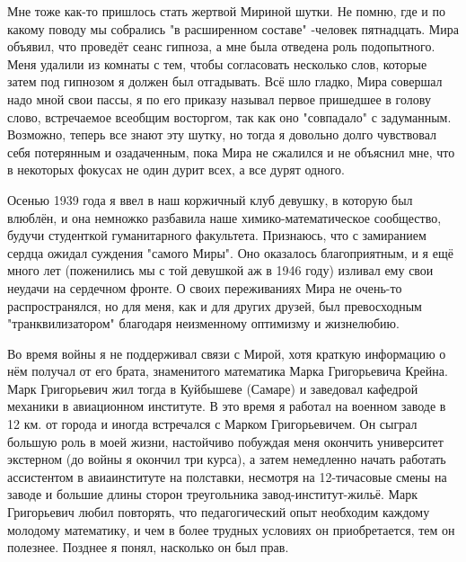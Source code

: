 Мне тоже как-то пришлось стать жертвой Мириной шутки. Не помню, где и по какому поводу мы собрались "в расширенном составе" -человек пятнадцать. Мира объявил, что проведёт сеанс гипноза, а мне была отведена роль подопытного. Меня удалили из комнаты с тем, чтобы согласовать несколько слов, которые затем под гипнозом я должен был отгадывать. Всё шло гладко, Мира совершал надо мной свои пассы, я по его приказу называл первое пришедшее в голову слово, встречаемое всеобщим восторгом, так как оно "совпадало" с задуманным. Возможно, теперь все знают эту шутку, но тогда я довольно долго чувствовал себя потерянным и озадаченным, пока Мира не сжалился и не объяснил мне, что в некоторых фокусах не один дурит всех, а все дурят одного.

Осенью 1939 года я ввел в наш коржичный клуб девушку, в которую был влюблён, и она немножко разбавила наше химико-математическое сообщество, будучи студенткой гуманитарного факультета. Признаюсь, что с замиранием сердца ожидал суждения "самого Миры". Оно оказалось благоприятным, и я ещё много лет (поженились мы с той девушкой аж в 1946 году) изливал ему свои неудачи на сердечном фронте. О своих переживаниях Мира не очень-то распространялся, но для меня, как и для других друзей, был превосходным "транквилизатором" благодаря неизменному оптимизму и жизнелюбию.

Во время войны я не поддерживал связи с Мирой, хотя краткую информацию о нём получал от его брата, знаменитого математика Марка Григорьевича Крейна. Марк Григорьевич жил тогда в Куйбышеве (Самаре) и заведовал кафедрой механики в авиационном институте. В это время я работал на военном заводе в 12 км. от города и иногда встречался с Марком Григорьевичем. Он сыграл большую роль в моей жизни, настойчиво побуждая меня окончить университет экстерном (до войны я окончил три курса), а затем немедленно начать работать ассистентом в авиаинституте на полставки, несмотря на 12-тичасовые смены на заводе и большие длины сторон треугольника завод-институт-жильё. Марк Григорьевич любил повторять, что педагогический опыт необходим каждому молодому математику, и чем в более трудных условиях он приобретается, тем он полезнее. Позднее я понял, насколько он был прав.

